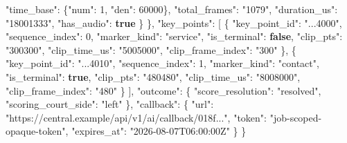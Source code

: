 \documentclass[
  9pt,
  a4paper,
]{article}
\newenvironment{Shaded}{}{}
\newcommand{\DataTypeTok}[1]{\textcolor[rgb]{0.56,0.13,0.00}{#1}}
\newcommand{\DecValTok}[1]{\textcolor[rgb]{0.25,0.63,0.44}{#1}}
\newcommand{\FunctionTok}[1]{\textcolor[rgb]{0.02,0.16,0.49}{#1}}
\newcommand{\KeywordTok}[1]{\textcolor[rgb]{0.00,0.44,0.13}{\textbf{#1}}}
\newcommand{\OtherTok}[1]{\textcolor[rgb]{0.00,0.44,0.13}{#1}}
\newcommand{\StringTok}[1]{\textcolor[rgb]{0.25,0.44,0.63}{#1}}
\begin{document}
\begin{Shaded}
\begin{Highlighting}[]
      \DataTypeTok{"time\_\allowbreak{}base"}\FunctionTok{:} \FunctionTok{\{}\DataTypeTok{"num"}\FunctionTok{:} \DecValTok{1}\FunctionTok{,} \DataTypeTok{"den"}\FunctionTok{:} \DecValTok{60000}\FunctionTok{\},}
      \DataTypeTok{"total\_\allowbreak{}frames"}\FunctionTok{:} \StringTok{"1079"}\FunctionTok{,}
      \DataTypeTok{"duration\_\allowbreak{}us"}\FunctionTok{:} \StringTok{"18001333"}\FunctionTok{,}
      \DataTypeTok{"has\_\allowbreak{}audio"}\FunctionTok{:} \KeywordTok{true}
    \FunctionTok{\}}
  \FunctionTok{\},}
  \DataTypeTok{"key\_\allowbreak{}points"}\FunctionTok{:} \OtherTok{[}
    \FunctionTok{\{}
      \DataTypeTok{"key\_\allowbreak{}point\_\allowbreak{}id"}\FunctionTok{:} \StringTok{"...4000"}\FunctionTok{,}
      \DataTypeTok{"sequence\_\allowbreak{}index"}\FunctionTok{:} \DecValTok{0}\FunctionTok{,}
      \DataTypeTok{"marker\_\allowbreak{}kind"}\FunctionTok{:} \StringTok{"service"}\FunctionTok{,}
      \DataTypeTok{"is\_\allowbreak{}terminal"}\FunctionTok{:} \KeywordTok{false}\FunctionTok{,}
      \DataTypeTok{"clip\_\allowbreak{}pts"}\FunctionTok{:} \StringTok{"300300"}\FunctionTok{,}
      \DataTypeTok{"clip\_\allowbreak{}time\_\allowbreak{}us"}\FunctionTok{:} \StringTok{"5005000"}\FunctionTok{,}
      \DataTypeTok{"clip\_\allowbreak{}frame\_\allowbreak{}index"}\FunctionTok{:} \StringTok{"300"}
    \FunctionTok{\}}\OtherTok{,}
    \FunctionTok{\{}
      \DataTypeTok{"key\_\allowbreak{}point\_\allowbreak{}id"}\FunctionTok{:} \StringTok{"...4010"}\FunctionTok{,}
      \DataTypeTok{"sequence\_\allowbreak{}index"}\FunctionTok{:} \DecValTok{1}\FunctionTok{,}
      \DataTypeTok{"marker\_\allowbreak{}kind"}\FunctionTok{:} \StringTok{"contact"}\FunctionTok{,}
      \DataTypeTok{"is\_\allowbreak{}terminal"}\FunctionTok{:} \KeywordTok{true}\FunctionTok{,}
      \DataTypeTok{"clip\_\allowbreak{}pts"}\FunctionTok{:} \StringTok{"480480"}\FunctionTok{,}
      \DataTypeTok{"clip\_\allowbreak{}time\_\allowbreak{}us"}\FunctionTok{:} \StringTok{"8008000"}\FunctionTok{,}
      \DataTypeTok{"clip\_\allowbreak{}frame\_\allowbreak{}index"}\FunctionTok{:} \StringTok{"480"}
    \FunctionTok{\}}
  \OtherTok{]}\FunctionTok{,}
  \DataTypeTok{"outcome"}\FunctionTok{:} \FunctionTok{\{}
    \DataTypeTok{"score\_\allowbreak{}resolution"}\FunctionTok{:} \StringTok{"resolved"}\FunctionTok{,}
    \DataTypeTok{"scoring\_\allowbreak{}court\_\allowbreak{}side"}\FunctionTok{:} \StringTok{"left"}
  \FunctionTok{\},}
  \DataTypeTok{"callback"}\FunctionTok{:} \FunctionTok{\{}
    \DataTypeTok{"url"}\FunctionTok{:} \StringTok{"https://central.example/api/v1/ai/callback/018f..."}\FunctionTok{,}
    \DataTypeTok{"token"}\FunctionTok{:} \StringTok{"job{-}scoped{-}opaque{-}token"}\FunctionTok{,}
    \DataTypeTok{"expires\_\allowbreak{}at"}\FunctionTok{:} \StringTok{"2026{-}08{-}07T06:00:00Z"}
  \FunctionTok{\}}
\FunctionTok{\}}
\end{Highlighting}
\end{Shaded}
\end{document}
